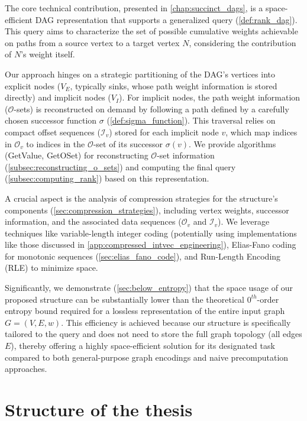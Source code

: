 The core technical contribution, presented in \autoref{chap:succinct_dags}, is a space-efficient DAG representation that supports a generalized \Rank{} query (\autoref{def:rank_dag}). This query aims to characterize the set of possible cumulative weights achievable on paths from a source vertex to a target vertex $N$, considering the contribution of $N$'s weight itself.

Our approach hinges on a strategic partitioning of the DAG's vertices into explicit nodes ($V_E$, typically sinks, whose path weight information is stored directly) and implicit nodes ($V_I$). For implicit nodes, the path weight information ($\mathcal{O}$-sets) is reconstructed on demand by following a path defined by a carefully chosen successor function $\sigma$ (\autoref{def:sigma_function}). This traversal relies on compact offset sequences ($\mathcal{I}_v$) stored for each implicit node $v$, which map indices in $\mathcal{O}_v$ to indices in the $\mathcal{O}$-set of its successor $\sigma(v)$. We provide algorithms (GetValue, GetOSet) for reconstructing $\mathcal{O}$-set information (\autoref{subsec:reconstructing_o_sets}) and computing the final \Rank{} query (\autoref{subsec:computing_rank}) based on this representation.

A crucial aspect is the analysis of compression strategies for the structure's components (\autoref{sec:compression_strategies}), including vertex weights, successor information, and the associated data sequences ($\mathcal{O}_v$ and $\mathcal{I}_v$). We leverage techniques like variable-length integer coding (potentially using implementations like those discussed in \autoref{app:compressed_intvec_engineering}), Elias-Fano coding for monotonic sequences (\autoref{sec:elias_fano_code}), and Run-Length Encoding (RLE) to minimize space.

Significantly, we demonstrate (\autoref{sec:below_entropy}) that the space usage of our proposed structure can be substantially lower than the theoretical $0^{th}$-order entropy bound required for a lossless representation of the entire input graph $G=(V, E, w)$. This efficiency is achieved because our structure is specifically tailored to the \Rank query and does not need to store the full graph topology (all edges $E$), thereby offering a highly space-efficient solution for its designated task compared to both general-purpose graph encodings and naive precomputation approaches.

\section{Structure of the thesis}
\label{sec:structure}

